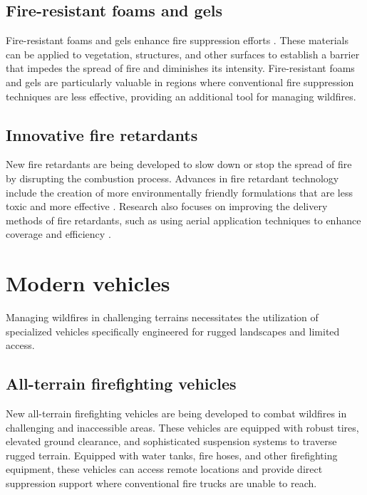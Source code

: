 \documentclass[
  12 pt,
]{Nemilov}
\begin{document}
\subsection{Fire-resistant foams and gels}\label{fire-resistant-foams-and-gels}

Fire-resistant foams and gels enhance fire suppression efforts \citep{cui2019water, harun2023fire, lyon1996fire}. These materials can be applied to vegetation, structures, and other surfaces to establish a barrier that impedes the spread of fire and diminishes its intensity. Fire-resistant foams and gels are particularly valuable in regions where conventional fire suppression techniques are less effective, providing an additional tool for managing wildfires.

\subsection{Innovative fire retardants}\label{innovative-fire-retardants}

New fire retardants are being developed to slow down or stop the spread of fire by disrupting the combustion process. Advances in fire retardant technology include the creation of more environmentally friendly formulations that are less toxic and more effective \citep{horrocks2008advances}. Research also focuses on improving the delivery methods of fire retardants, such as using aerial application techniques to enhance coverage and efficiency \citep{yu2019wildfire}.

\section{Modern vehicles}\label{modern-vehicles}

Managing wildfires in challenging terrains necessitates the utilization of specialized vehicles specifically engineered for rugged landscapes and limited access.

\subsection{All-terrain firefighting vehicles}\label{all-terrain-firefighting-vehicles}

New all-terrain firefighting vehicles are being developed to combat wildfires in challenging and inaccessible areas. These vehicles are equipped with robust tires, elevated ground clearance, and sophisticated suspension systems to traverse rugged terrain. Equipped with water tanks, fire hoses, and other firefighting equipment, these vehicles can access remote locations and provide direct suppression support where conventional fire trucks are unable to reach.
\end{document}

